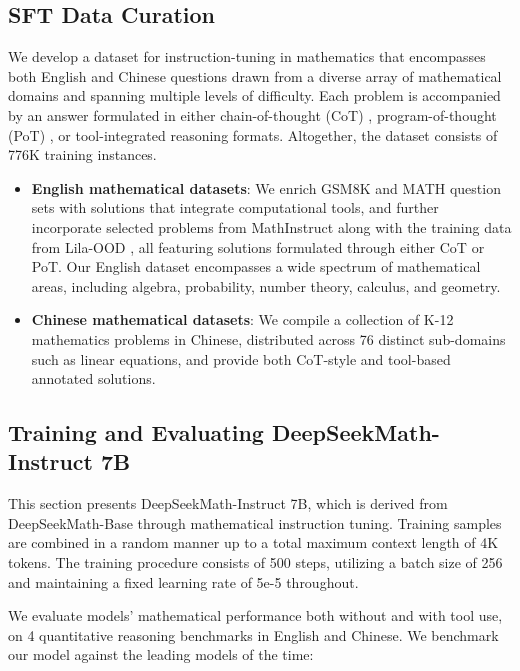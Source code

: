 \begin{itemize}[topsep=0pt]
\subsection{SFT Data Curation}

We develop a dataset for instruction-tuning in mathematics that encompasses both English and Chinese questions drawn from a diverse array of mathematical domains and spanning multiple levels of difficulty. Each problem is accompanied by an answer formulated in either chain-of-thought (CoT) \citep{cot}, program-of-thought (PoT) \citep{pot,pal}, or tool-integrated reasoning \citep{tora} formats. Altogether, the dataset consists of 776K training instances.

\begin{itemize}[topsep=0pt]
    \item \textbf{English mathematical datasets}: We enrich GSM8K and MATH question sets with solutions that integrate computational tools, and further incorporate selected problems from MathInstruct \citep{MathInstruct} along with the training data from Lila-OOD \citep{lila}, all featuring solutions formulated through either CoT or PoT. Our English dataset encompasses a wide spectrum of mathematical areas, including algebra, probability, number theory, calculus, and geometry.
    \item \textbf{Chinese mathematical datasets}: We compile a collection of K-12 mathematics problems in Chinese, distributed across 76 distinct sub-domains such as linear equations, and provide both CoT-style and tool-based annotated solutions.
\end{itemize}

\subsection{Training and Evaluating DeepSeekMath-Instruct 7B}

This section presents DeepSeekMath-Instruct 7B, which is derived from DeepSeekMath-Base through mathematical instruction tuning. Training samples are combined in a random manner up to a total maximum context length of 4K tokens. The training procedure consists of 500 steps, utilizing a batch size of 256 and maintaining a fixed learning rate of 5e-5 throughout.

We evaluate models' mathematical performance both without and with tool use, on 4 quantitative reasoning benchmarks in English and Chinese. We benchmark our model against the leading models of the time:


\end{itemize}

